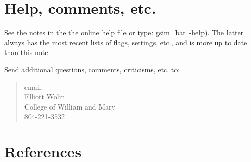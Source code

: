 \documentclass{article}
\begin{document}
\section{Help, comments, etc.}
\label{help}

See the notes in the %
the online help file
or type: gsim\_bat~-help).
The latter always has the most recent lists of flags, settings, etc.,
and is more up to date than this note.

Send additional questions, comments, criticisms, etc. to:
\begin{quote}
email: %
\\
Elliott Wolin \\
College of William and Mary\\
804-221-3532
\end{quote}


\newpage
\section{References}
\label{references}
\end{document}
